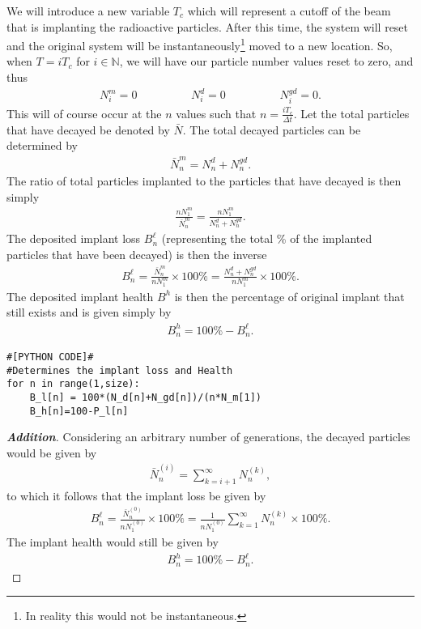 \documentclass[11pt]{article}
\newenvironment{Addition}
{\let\oldqedsymbol=\qedsymbol
	\renewcommand{\qedsymbol}{$ $}
	\begin{proof}[\bfseries\upshape \color{blue}Addition]\color{blue}}
	{\end{proof}
	\renewcommand{\qedsymbol}{\oldqedsymbol}}
\begin{document}
We will introduce a new variable $T_c$ which will represent a cutoff of the beam that is implanting the radioactive particles. After this time, the system will reset and the original system will be instantaneously\footnote{In reality this would not be instantaneous.} moved to a new location. So, when $T=iT_c$ for $i\in\mathbb{N}$, we will have our particle number values reset to zero, and thus
\begin{align}
N^m_i = 0 \hspace{2cm} N^d_i =0 \hspace{2cm} N^{gd}_i =0.
\end{align}
This will of course occur at the $n$ values such that $n=\frac{iT_c}{\Delta t}$. Let the total particles that have decayed be denoted by $\bar{N}$. The total decayed particles can be determined by
\begin{align}
\bar{N}^m_n=N^d_n+N^{gd}_n.
\end{align}
The ratio of total particles implanted to the particles that have decayed is then simply
\begin{align}
\frac{nN^m_1}{\bar{N}^m_n} = \frac{nN^m_1}{N^d_n+N^{gd}_n}.
\end{align}
The deposited implant loss $B^\ell_n$ (representing the total \% of the implanted particles that have been decayed) is then the inverse
\begin{align}
B^\ell_n=\frac{\bar{N}^m_n}{nN^m_1}\times 100\% = \frac{N^d_n+N^{gd}_n}{nN^m_1} \times 100\%.
\end{align}
The deposited implant health $B^h$ is then the percentage of original implant that still exists and is given simply by
\begin{align}
B^h_n = 100 \% - B^\ell_n.
\end{align}
\begin{lstlisting}
#[PYTHON CODE]#
#Determines the implant loss and Health
for n in range(1,size):
	B_l[n] = 100*(N_d[n]+N_gd[n])/(n*N_m[1])
	B_h[n]=100-P_l[n]
\end{lstlisting}

\begin{Addition}
	Considering an arbitrary number of generations, the decayed particles would be given by
	\begin{align}
	\bar{N}^{(i)}_n = \sum_{k=i+1}^{\infty} N^{(k)}_n,
	\end{align} 
	to which it follows that the implant loss be given by
	\begin{align}
	B^\ell_n=\frac{\bar{N}^{(0)}_n}{nN^{(0)}_1}\times 100\% = \frac{1}{nN^{(0)}_1}\sum_{k=1}^{\infty} N^{(k)}_n \times 100\%.
	\end{align}
	The implant health would still be given by
	\begin{align}
	B^h_n = 100 \% - B^\ell_n.
	\end{align}
\end{Addition}
\end{document}
